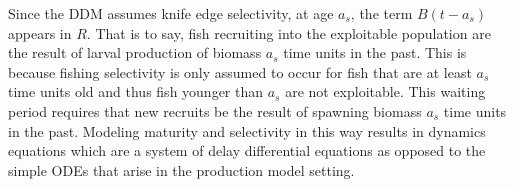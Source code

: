 %
Since the DDM assumes knife edge selectivity, at age $a_s$, the term
$B(t-a_s)$ appears in $R$. That is to say, fish recruiting into the exploitable
population are the result of larval production of biomass $a_s$ time
units in the past. This is because fishing selectivity is only assumed to occur
for fish that are at least $a_s$ time units old and thus fish younger than $a_s$
are not exploitable. This waiting period requires that new recruits be the
result of spawning biomass $a_s$ time units in the past. Modeling maturity and 
selectivity in this way results in dynamics equations which are a system of 
delay differential equations as opposed to the simple ODEs that arise in the 
production model setting.

%

